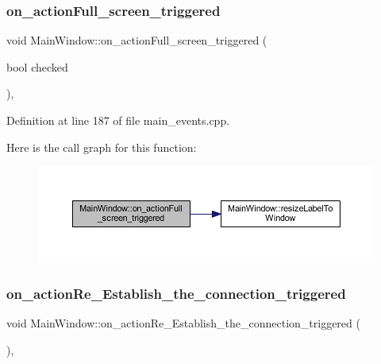\subsubsection{\texorpdfstring{on\_actionFull\_screen\_triggered}{on\_actionFull\_screen\_triggered}}
{\footnotesize\ttfamily void Main\+Window\+::on\+\_\+action\+Full\+\_\+screen\+\_\+triggered (\begin{DoxyParamCaption}\item[{bool}]{checked }\end{DoxyParamCaption})\hspace{0.3cm}{\ttfamily [private]}, {\ttfamily [slot]}}



Definition at line 187 of file main\+\_\+events.\+cpp.

Here is the call graph for this function\+:
\nopagebreak
\begin{figure}[H]
\begin{center}
\leavevmode
\includegraphics[width=350pt]{class_main_window_ad210784d93519aa0e1664b943142ad97_cgraph}
\end{center}
\end{figure}
\mbox{\label{class_main_window_abe15cc441416a5266df8770298aca76b}} 
\subsubsection{\texorpdfstring{on\_actionRe\_Establish\_the\_connection\_triggered}{on\_actionRe\_Establish\_the\_connection\_triggered}}
{\footnotesize\ttfamily void Main\+Window\+::on\+\_\+action\+Re\+\_\+\+Establish\+\_\+the\+\_\+connection\+\_\+triggered (\begin{DoxyParamCaption}{ }\end{DoxyParamCaption})\hspace{0.3cm}{\ttfamily [private]}, {\ttfamily [slot]}}



